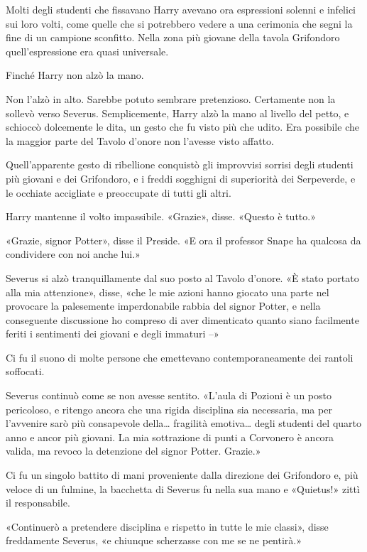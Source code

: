 Molti degli studenti che fissavano Harry avevano ora espressioni solenni e infelici sui loro volti, come quelle che si potrebbero vedere a una cerimonia che segni la fine di un campione sconfitto. Nella zona più giovane della tavola Grifondoro quell’espressione era quasi universale.

Finché Harry non alzò la mano.

Non l’alzò in alto. Sarebbe potuto sembrare pretenzioso. Certamente non la sollevò verso Severus. Semplicemente, Harry alzò la mano al livello del petto, e schioccò dolcemente le dita, un gesto che fu visto più che udito. Era possibile che la maggior parte del Tavolo d’onore non l’avesse visto affatto.

Quell’apparente gesto di ribellione conquistò gli improvvisi sorrisi degli studenti più giovani e dei Grifondoro, e i freddi sogghigni di superiorità dei Serpeverde, e le occhiate accigliate e preoccupate di tutti gli altri.

Harry mantenne il volto impassibile. «Grazie», disse. «Questo è tutto.»

«Grazie, signor Potter», disse il Preside. «E ora il professor Snape ha qualcosa da condividere con noi anche lui.»

Severus si alzò tranquillamente dal suo posto al Tavolo d’onore. «È stato portato alla mia attenzione», disse, «che le mie azioni hanno giocato una parte nel provocare la palesemente imperdonabile rabbia del signor Potter, e nella conseguente discussione ho compreso di aver dimenticato quanto siano facilmente feriti i sentimenti dei giovani e degli immaturi –»

Ci fu il suono di molte persone che emettevano contemporaneamente dei rantoli soffocati.

Severus continuò come se non avesse sentito. «L’aula di Pozioni è un posto pericoloso, e ritengo ancora che una rigida disciplina sia necessaria, ma per l’avvenire sarò più consapevole della… fragilità emotiva… degli studenti del quarto anno e ancor più giovani. La mia sottrazione di punti a Corvonero è ancora valida, ma revoco la detenzione del signor Potter. Grazie.»

Ci fu un singolo battito di mani proveniente dalla direzione dei Grifondoro e, più veloce di un fulmine, la bacchetta di Severus fu nella sua mano e «Quietus!» zittì il responsabile.

«Continuerò a pretendere disciplina e rispetto in tutte le mie classi», disse freddamente Severus, «e chiunque scherzasse con me se ne pentirà.»

